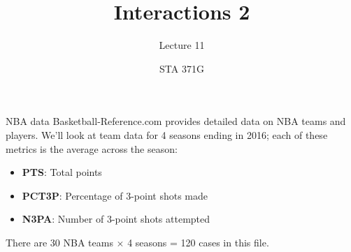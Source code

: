 \documentclass{beamer}\usepackage[]{graphicx}\usepackage[]{color}
\title{Interactions 2}
\subtitle{Lecture 11}
\author{STA 371G}
\begin{document}
  
  

  \frame{\maketitle}



  \begin{darkframes}
    \begin{frame}{NBA data}
      Basketball-Reference.com provides detailed data on NBA teams and players. We'll look at team data for 4 seasons ending in 2016; each of these metrics is the average across the season:
      \begin{itemize}
        \item \textbf{PTS}: Total points
        \item \textbf{PCT3P}: Percentage of 3-point shots made
        \item \textbf{N3PA}: Number of 3-point shots attempted
      \end{itemize}
      There are 30 NBA teams $\times$ 4 seasons = 120 cases in this file.
      \lc
    \end{frame}


\end{darkframes}
\end{document}
